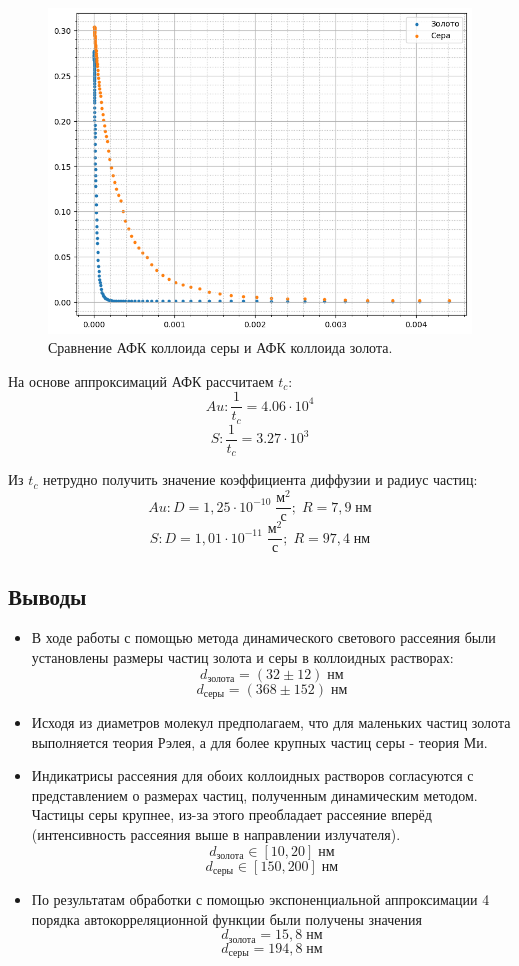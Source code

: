 \documentclass{article}
\begin{document}
\newpage
\begin{figure}[h!]
\centering
    \includegraphics[width=0.8\linewidth]{Images/АФК.png}
    \caption{Сравнение АФК коллоида серы и АФК коллоида золота.}
\end{figure}

На основе аппроксимаций АФК рассчитаем $t_c$: 
$$Au: \frac{1}{t_c} = 4.06 \cdot 10^{4}$$
$$S: \frac{1}{t_c} = 3.27 \cdot 10^{3}$$

Из $t_c$ нетрудно получить значение коэффициента диффузии и радиус частиц:
$$Au: D = 1,25 \cdot 10^{-10} \; \frac{\text{м}^2}{\text{с}};\; R = 7,9 \;\text{нм}$$
$$S:  D = 1,01 \cdot 10^{-11} \; \frac{\text{м}^2}{\text{с}};\; R = 97,4 \;\text{нм} $$

\subsection{Выводы}
\begin{itemize}
    \item В ходе работы с помощью метода динамического светового рассеяния были установлены размеры частиц золота и серы в коллоидных растворах:
    $$d_{\text{золота}} = (32 \pm 12) \;\text{нм}$$
    $$d_{\text{серы}} = (368 \pm 152) \;\text{нм}$$
    \item Исходя из диаметров молекул предполагаем, что для маленьких частиц золота выполняется теория Рэлея, а для более крупных частиц серы - теория Ми.
    \item Индикатрисы рассеяния для обоих коллоидных растворов согласуются с представлением о размерах частиц, полученным динамическим методом. Частицы серы крупнее, из-за этого преобладает рассеяние вперёд (интенсивность рассеяния выше в направлении излучателя).
    $$d_{\text{золота}} \in [10, 20] \;\text{нм}$$
    $$d_{\text{серы}} \in [150, 200] \;\text{нм}$$
    \item По результатам обработки с помощью экспоненциальной аппроксимации 4 порядка автокорреляционной функции были получены значения
    $$d_{\text{золота}} = 15,8\;\text{нм}$$
    $$d_{\text{серы}} = 194,8 \;\text{нм}$$
\end{itemize}
\end{document}
